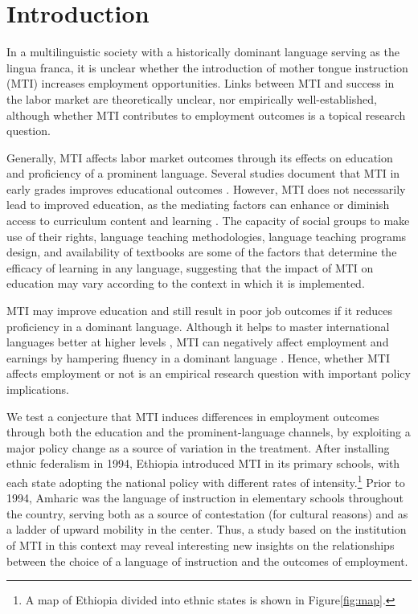 \section{Introduction}
\label{section:intro}

In a multilinguistic society with a historically dominant language serving as the lingua franca, it is unclear whether the introduction of mother tongue instruction (MTI) increases employment opportunities.  Links between MTI and success in the labor market are theoretically unclear, nor empirically well-established, although whether MTI contributes to employment outcomes is a topical research question.  

Generally, MTI affects labor market outcomes through its effects on education and proficiency of a prominent language. Several studies document that MTI in early grades improves educational outcomes \citep[e.g.,][]{Walter2012,taylor_estimating_2016}. However, MTI does not necessarily lead to improved education, as the mediating factors can enhance or diminish access to curriculum content and learning \citep{Heugh2007}. The capacity of social groups to make use of their rights, language teaching methodologies, language teaching programs design, and availability of textbooks are some of the factors that determine the efficacy of learning in any language, suggesting that the impact of MTI on education may vary according to the context in which it is implemented. 

MTI may improve education and still result in poor job outcomes if it reduces proficiency in a dominant language. Although it helps to master international languages better at higher levels \citep[e.g.,][]{seid_impact_2019}, MTI can negatively affect employment and earnings by hampering fluency in a dominant language \citep[e.g.,][]{chiswick_endogeneity_2015}. Hence, whether MTI affects employment or not is an empirical research question with important policy implications. 

We test a conjecture that MTI induces differences in employment outcomes through both the education and the prominent-language channels, by exploiting a major policy change as a source of variation in the treatment. After installing ethnic federalism in 1994, Ethiopia introduced MTI in its primary schools, with each state adopting the national policy with different rates of intensity.\footnote{A map of Ethiopia divided into ethnic states is shown in Figure\ref{fig:map}.} Prior to 1994, Amharic was the language of instruction in elementary schools throughout the country, serving both as a source of contestation (for cultural reasons) and as a ladder of upward mobility in the center. Thus, a study based on the institution of MTI in this context may reveal interesting new insights on the relationships between the choice of a language of instruction and the outcomes of employment.  


